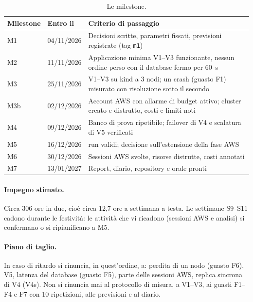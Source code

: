 \begin{table}[htbp]
\centering
\caption{Le milestone.}
\label{tab:milestone}
\begin{tabularx}{\linewidth}{@{}llL@{}}
\toprule
\textbf{Milestone} & \textbf{Entro il} & \textbf{Criterio di passaggio} \\
\midrule
M1 & 04/11/2026 & Decisioni scritte, parametri fissati, previsioni registrate (tag \texttt{m1}) \\
M2 & 11/11/2026 & Applicazione minima V1--V3 funzionante, nessun ordine perso con il database fermo per 60~s \\
M3 & 25/11/2026 & V1--V3 su kind a 3 nodi; un crash (guasto F1) misurato con risoluzione sotto il secondo \\
M3b & 02/12/2026 & Account AWS con allarme di budget attivo; cluster creato e distrutto, costi e limiti noti \\
M4 & 09/12/2026 & Banco di prova ripetibile; failover di V4 e scalatura di V5 verificati \\
M5 & 16/12/2026 &  run validi; decisione sull'estensione della fase AWS \\
M6 & 30/12/2026 & Sessioni AWS svolte, risorse distrutte, costi annotati \\
M7 & 13/01/2027 & Report, diario, repository e orale pronti \\
\bottomrule
\end{tabularx}
\end{table}

\paragraph{Impegno stimato.} Circa 306 ore in due, cioè circa 12,7 ore a settimana a testa. Le settimane S9--S11 cadono durante le festività: le attività che vi ricadono (sessioni AWS e analisi) si confermano o si ripianificano a M5.

\paragraph{Piano di taglio.} In caso di ritardo si rinuncia, in quest'ordine, a: perdita di un nodo (guasto F6), V5, latenza del database (guasto F5), parte delle sessioni AWS, replica sincrona di V4 (V4s). Non si rinuncia mai al protocollo di misura, a V1--V3, ai guasti F1--F4 e F7 con 10 ripetizioni, alle previsioni e al diario.
